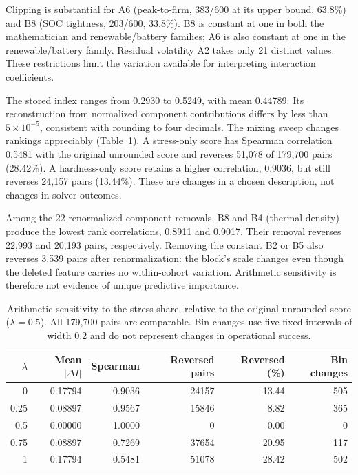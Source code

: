 Clipping is substantial for A6 (peak-to-firm, 383/600 at its upper bound,
63.8\%) and B8 (SOC tightness, 203/600, 33.8\%). B8 is constant at one
in both the mathematician and renewable/battery families; A6 is also constant
at one in the renewable/battery family. Residual volatility A2 takes only
21 distinct values. These restrictions limit the variation available
for interpreting interaction coefficients.

The stored index ranges from 0.2930 to 0.5249, with mean 0.44789.
Its reconstruction from normalized component contributions differs by
less than $5\times10^{-5}$, consistent with rounding to four decimals.
The mixing sweep changes rankings appreciably (Table~\ref{tab:p1_mix}).
A stress-only score has Spearman correlation 0.5481 with the original
unrounded score and reverses 51,078 of 179,700 pairs (28.42\%).
A hardness-only score retains a higher correlation, 0.9036, but still
reverses 24,157 pairs (13.44\%). These are changes in a chosen description,
not changes in solver outcomes.

Among the 22 renormalized component removals, B8 and B4 (thermal density)
produce the lowest rank correlations, 0.8911 and 0.9017. Their removal
reverses 22,993 and 20,193 pairs, respectively. Removing the constant B2
or B5 also reverses 3,539 pairs after renormalization: the block's scale
changes even though the deleted feature carries no within-cohort variation.
Arithmetic sensitivity is therefore not evidence of unique predictive
importance.

\begin{table}[htbp]\centering\small
\begin{tabular}{rrrrrr}\toprule
$\lambda$ & Mean $|\Delta I|$ & Spearman & Reversed pairs & Reversed (\%) & Bin changes\\\midrule
0 & 0.17794 & 0.9036 & 24157 & 13.44 & 505 \\
0.25 & 0.08897 & 0.9567 & 15846 & 8.82 & 365 \\
0.5 & 0.00000 & 1.0000 & 0 & 0.00 & 0 \\
0.75 & 0.08897 & 0.7269 & 37654 & 20.95 & 117 \\
1 & 0.17794 & 0.5481 & 51078 & 28.42 & 502 \\
\bottomrule\end{tabular}
\caption{Arithmetic sensitivity to the stress share, relative to the original unrounded score ($\lambda=0.5$). All 179,700 pairs are comparable. Bin changes use five fixed intervals of width 0.2 and do not represent changes in operational success.}
\label{tab:p1_mix}
\end{table}

